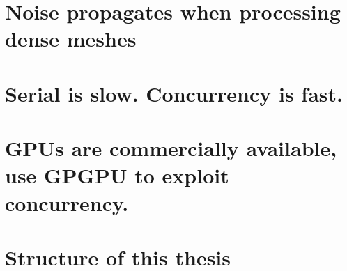 \section{Noise propagates when processing dense meshes}

%
%
\section{Serial is slow. Concurrency is fast.}
%
\section{GPUs are commercially available, use GPGPU to exploit concurrency.}
%
\section{Structure of this thesis}
